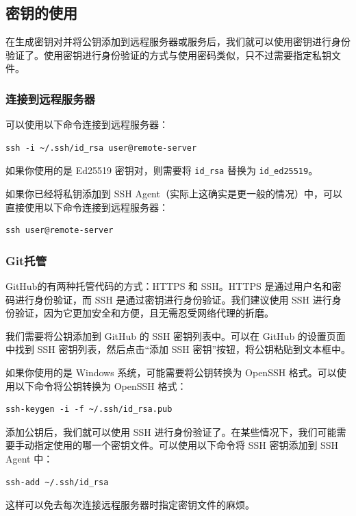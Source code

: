 \documentclass[../main.tex]{subfiles}
\begin{document}
\subsection{密钥的使用}

在生成密钥对并将公钥添加到远程服务器或服务后，我们就可以使用密钥进行身份验证了。使用密钥进行身份验证的方式与使用密码类似，只不过需要指定私钥文件。

\subsubsection{连接到远程服务器}

可以使用以下命令连接到远程服务器：
\begin{verbatim}
ssh -i ~/.ssh/id_rsa user@remote-server
\end{verbatim}
如果你使用的是 Ed25519 密钥对，则需要将 \texttt{id\_rsa} 替换为 \texttt{id\_ed25519}。

如果你已经将私钥添加到 SSH Agent（实际上这确实是更一般的情况）中，可以直接使用以下命令连接到远程服务器：
\begin{verbatim}
ssh user@remote-server
\end{verbatim}

\subsubsection{Git托管}

GitHub的有两种托管代码的方式：HTTPS 和 SSH。HTTPS 是通过用户名和密码进行身份验证，而 SSH 是通过密钥进行身份验证。我们建议使用 SSH 进行身份验证，因为它更加安全和方便，且无需忍受网络代理的折磨。

我们需要将公钥添加到 GitHub 的 SSH 密钥列表中。可以在 GitHub 的设置页面中找到 SSH 密钥列表，然后点击“添加 SSH 密钥”按钮，将公钥粘贴到文本框中。

如果你使用的是 Windows 系统，可能需要将公钥转换为 OpenSSH 格式。可以使用以下命令将公钥转换为 OpenSSH 格式：
\begin{verbatim}
ssh-keygen -i -f ~/.ssh/id_rsa.pub
\end{verbatim}

添加公钥后，我们就可以使用 SSH 进行身份验证了。在某些情况下，我们可能需要手动指定使用的哪一个密钥文件。可以使用以下命令将 SSH 密钥添加到 SSH Agent 中：
\begin{verbatim}
ssh-add ~/.ssh/id_rsa
\end{verbatim}

这样可以免去每次连接远程服务器时指定密钥文件的麻烦。
\end{document}
